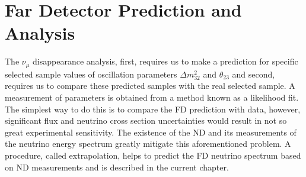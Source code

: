 \chapter{Far Detector Prediction and Analysis}
\label{prediction_chapter}

The $\nu_\mu$ disappearance analysis, first, requires us to make
a prediction for specific selected sample values of oscillation parameters $\Delta m^2_{32}$ and 
$\theta_{23}$ and second, requires us to compare these predicted samples with the real selected sample. A measurement 
of parameters is obtained from a method known as a likelihood fit. The simplest way to do this is to 
compare the FD prediction with data, however, significant flux and neutrino cross section
uncertainties would result in not so great experimental sensitivity. The existence of the ND and its measurements
of the neutrino energy spectrum greatly mitigate this aforementioned problem. A procedure, called extrapolation, 
helps to predict the FD neutrino spectrum based on ND measurements and is described in the current chapter.

